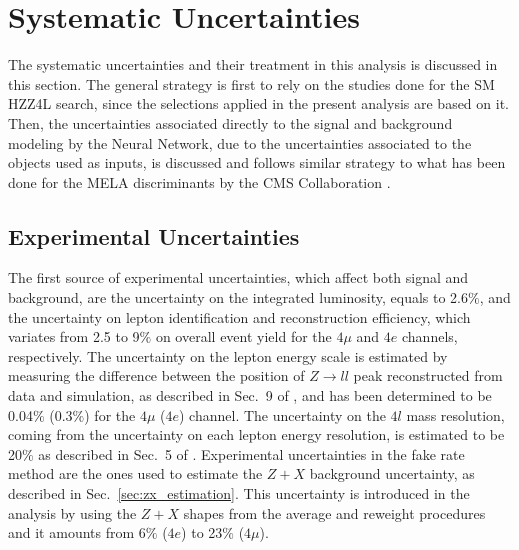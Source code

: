 \chapter{Systematic Uncertainties}
\label{sec:systematic_uncertainties}
The systematic uncertainties and their treatment in this analysis is discussed in this section. The general strategy is first to rely on the studies done for the SM HZZ4L search, since the selections applied in the present analysis are based on it. Then, the uncertainties associated directly to the signal and background modeling by the Neural Network, due to the uncertainties associated to the objects used as inputs, is discussed and follows similar strategy to what has been done for the MELA discriminants by the CMS Collaboration \cite{bib:CMS-AN-15-277}.

\section{Experimental Uncertainties}
\label{subsec:experimental_uncertainties}
The first source of experimental uncertainties, which affect both signal and background, are the uncertainty on the integrated luminosity, equals to 2.6$\%$, and the uncertainty on lepton identification and reconstruction efficiency, which variates from 2.5 to 9$\%$ on overall event yield for the $4\mu$ and $4e$ channels, respectively. The uncertainty on the lepton energy scale is estimated by measuring the difference between the position of $Z \rightarrow ll$ peak reconstructed from data and simulation, as described in Sec.~9 of \cite{bib:CMS-AN-16-442}, and has been determined to be 0.04$\%$ (0.3$\%$) for the $4\mu$ ($4e$) channel. The uncertainty on the $4l$ mass resolution, coming from the uncertainty on each lepton energy resolution, is estimated to be 20$\%$ as described in Sec.~5 of \cite{bib:CMS-AN-16-442}. Experimental uncertainties in the fake rate method are the ones used to estimate the $Z+X$ background uncertainty, as described in Sec.~\ref{sec:zx_estimation}. This uncertainty is introduced in the analysis by using the $Z+X$ shapes from the average and reweight procedures and it amounts from 6$\%$ ($4e$) to 23$\%$ ($4\mu$).


